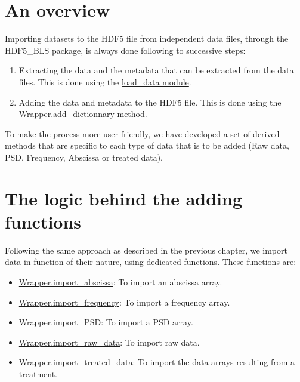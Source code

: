 \section{An overview}
    
    Importing datasets to the HDF5 file from independent data files, through the HDF5\_BLS package, is always done following to successive steps:
    \begin{enumerate}
        \item Extracting the data and the metadata that can be extracted from the data files. This is done using the \hyperref[chap:load_data]{load\_data module}.
        \item Adding the data and metadata to the HDF5 file. This is done using the \hyperref[subsec:wrapper.add_dictionnary]{Wrapper.add\_dictionnary} method.
    \end{enumerate}

    To make the process more user friendly, we have developed a set of derived methods that are specific to each type of data that is to be added (Raw data, PSD, Frequency, Abscissa or treated data). 

\section{The logic behind the adding functions}
    Following the same approach as described in the previous chapter, we import data in function of their nature, using dedicated functions. These functions are:
    \begin{itemize}
        \item \hyperref[subsec:wrapper.import_abscissa]{Wrapper.import\_abscissa}: To import an abscissa array.
        \item \hyperref[subsec:wrapper.import_frequency]{Wrapper.import\_frequency}: To import a frequency array.
        \item \hyperref[subsec:wrapper.import_psd]{Wrapper.import\_PSD}: To import a PSD array.
        \item \hyperref[subsec:wrapper.import_raw_data]{Wrapper.import\_raw\_data}: To import raw data.
        \item \hyperref[subsec:wrapper.import_treated_data]{Wrapper.import\_treated\_data}: To import the data arrays resulting from a treatment.
    \end{itemize}

